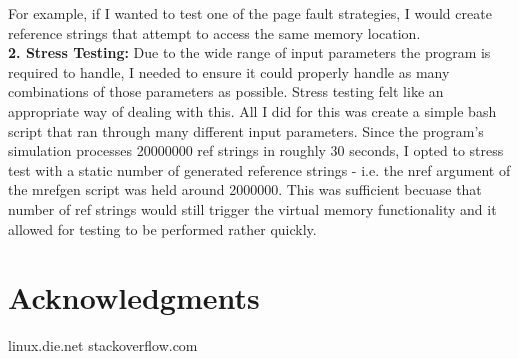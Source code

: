 \documentclass{article}
\begin{document}
\noindent
For example, if I wanted to test one of the page fault strategies,
I would create reference strings that attempt to access the same memory location. \\

\noindent
\textbf{2. Stress Testing:}
Due to the wide range of input parameters the program is required to handle, I needed
to ensure it could properly handle as many combinations of those parameters as possible.
Stress testing felt like an appropriate way of dealing with this.
All I did for this was create a simple bash script that ran through many different input
parameters. Since the program's simulation processes 20000000 ref strings in roughly
30 seconds, I opted to stress test with a static number of generated reference strings -
i.e. the nref argument of the mrefgen script was held around 2000000. This was sufficient
becuase that number of ref strings would still trigger the virtual memory functionality
and it allowed for testing to be performed rather quickly. \\

\section{Acknowledgments}
linux.die.net
stackoverflow.com
\end{document}
